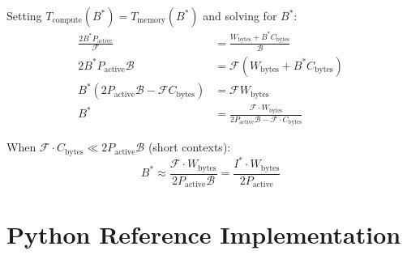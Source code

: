 \documentclass[11pt,a4paper]{article}
\newcommand{\Tcomp}{T_{\mathrm{compute}}}
\newcommand{\Tmem}{T_{\mathrm{memory}}}
\newcommand{\BW}{\mathcal{B}}
\newcommand{\FLOPS}{\mathcal{F}}
\begin{document}
Setting $\Tcomp(B^*) = \Tmem(B^*)$ and solving for $B^*$:
\begin{align}
  \frac{2 B^* P_\text{active}}{\FLOPS}
  &= \frac{W_\text{bytes} + B^* C_\text{bytes}}{\BW} \\
  2 B^* P_\text{active} \BW
  &= \FLOPS (W_\text{bytes} + B^* C_\text{bytes}) \\
  B^*(2 P_\text{active} \BW - \FLOPS C_\text{bytes})
  &= \FLOPS W_\text{bytes} \\
  B^*
  &= \frac{\FLOPS \cdot W_\text{bytes}}
          {2 P_\text{active} \BW - \FLOPS \cdot C_\text{bytes}}
\end{align}

When $\FLOPS \cdot C_\text{bytes} \ll 2 P_\text{active} \BW$ (short contexts):
\[
  B^* \approx \frac{\FLOPS \cdot W_\text{bytes}}{2 P_\text{active} \BW}
            = \frac{I^* \cdot W_\text{bytes}}{2 P_\text{active}}
\]

\section{Python Reference Implementation}
\label{app:code}
\end{document}

